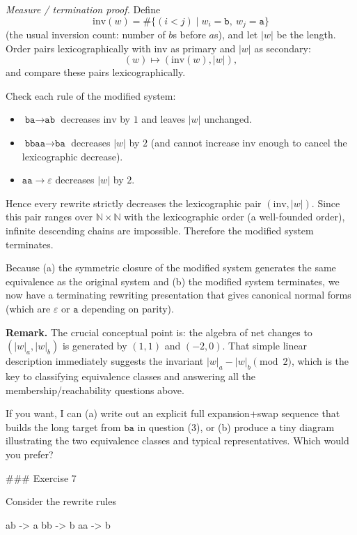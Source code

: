 \documentclass[12pt]{article}
\begin{document}
\emph{Measure / termination proof.} Define
\[
\mathrm{inv}(w)=\#\{(i<j)\mid w_i=\texttt{b},\ w_j=\texttt{a}\}
\]
(the usual inversion count: number of \(b\)s before \(a\)s), and let \(|w|\) be the length. Order pairs lexicographically with \(\mathrm{inv}\) as primary and \(|w|\) as secondary:
\[
(w) \mapsto (\mathrm{inv}(w),|w|),
\]
and compare these pairs lexicographically.

Check each rule of the modified system:
\begin{itemize}
  \item \(\texttt{ba}\to\texttt{ab}\) decreases \(\mathrm{inv}\) by \(1\) and leaves \(|w|\) unchanged.
  \item \(\texttt{bbaa}\to\texttt{ba}\) decreases \(|w|\) by \(2\) (and cannot increase \(\mathrm{inv}\) enough to cancel the lexicographic decrease).
  \item \(\texttt{aa}\to\varepsilon\) decreases \(|w|\) by \(2\).
\end{itemize}
Hence every rewrite strictly decreases the lexicographic pair \((\mathrm{inv},|w|)\). Since this pair ranges over \(\mathbb{N}\times\mathbb{N}\) with the lexicographic order (a well-founded order), infinite descending chains are impossible. Therefore the modified system terminates.

Because (a) the symmetric closure of the modified system generates the same equivalence as the original system and (b) the modified system terminates, we now have a terminating rewriting presentation that gives canonical normal forms (which are \(\varepsilon\) or \(\texttt{a}\) depending on parity).

\bigskip

\textbf{Remark.} The crucial conceptual point is: the algebra of net changes to \((|w|_a,|w|_b)\) is generated by \((1,1)\) and \((-2,0)\). That simple linear description immediately suggests the invariant \(|w|_a-|w|_b \pmod{2}\), which is the key to classifying equivalence classes and answering all the membership/reachability questions above.

\bigskip

If you want, I can (a) write out an explicit full expansion+swap sequence that builds the long target from \(\texttt{ba}\) in question (3), or (b) produce a tiny diagram illustrating the two equivalence classes and typical representatives. Which would you prefer?

### Exercise 7

Consider the rewrite rules

        ab -> a
        bb -> b
        aa -> b
        
\end{document}
